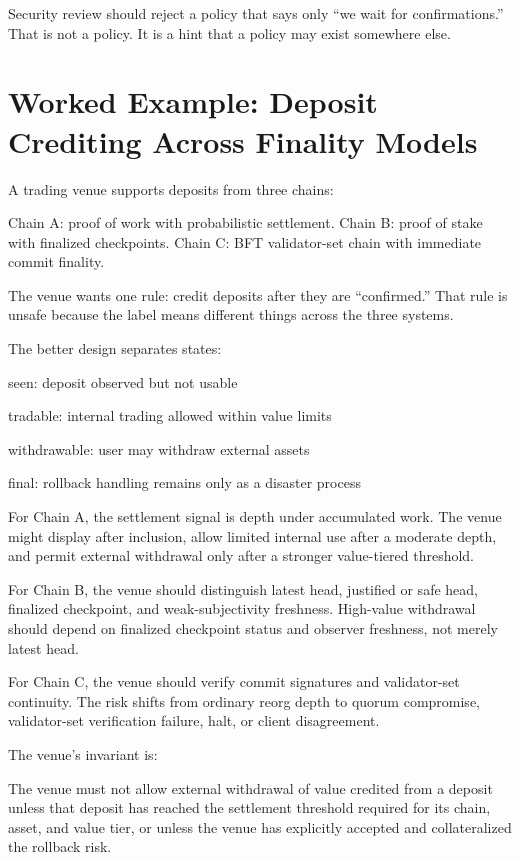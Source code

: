Security review should reject a policy that says only ``we wait for confirmations.'' That is not a policy. It is a hint that a policy may exist somewhere else.

\section{Worked Example: Deposit Crediting Across Finality Models}

A trading venue supports deposits from three chains:

\begin{codeblock}
Chain A: proof of work with probabilistic settlement.
Chain B: proof of stake with finalized checkpoints.
Chain C: BFT validator-set chain with immediate commit finality.
\end{codeblock}

The venue wants one rule: credit deposits after they are ``confirmed.'' That rule is unsafe because the label means different things across the three systems.

The better design separates states:

\begin{codeblock}
seen:
    deposit observed but not usable

tradable:
    internal trading allowed within value limits

withdrawable:
    user may withdraw external assets

final:
    rollback handling remains only as a disaster process
\end{codeblock}

For Chain A, the settlement signal is depth under accumulated work. The venue might display after inclusion, allow limited internal use after a moderate depth, and permit external withdrawal only after a stronger value-tiered threshold.

For Chain B, the venue should distinguish latest head, justified or safe head, finalized checkpoint, and weak-subjectivity freshness. High-value withdrawal should depend on finalized checkpoint status and observer freshness, not merely latest head.

For Chain C, the venue should verify commit signatures and validator-set continuity. The risk shifts from ordinary reorg depth to quorum compromise, validator-set verification failure, halt, or client disagreement.

The venue's invariant is:

\begin{codeblock}
The venue must not allow external withdrawal of value credited from
a deposit unless that deposit has reached the settlement threshold
required for its chain, asset, and value tier, or unless the venue has
explicitly accepted and collateralized the rollback risk.
\end{codeblock}

